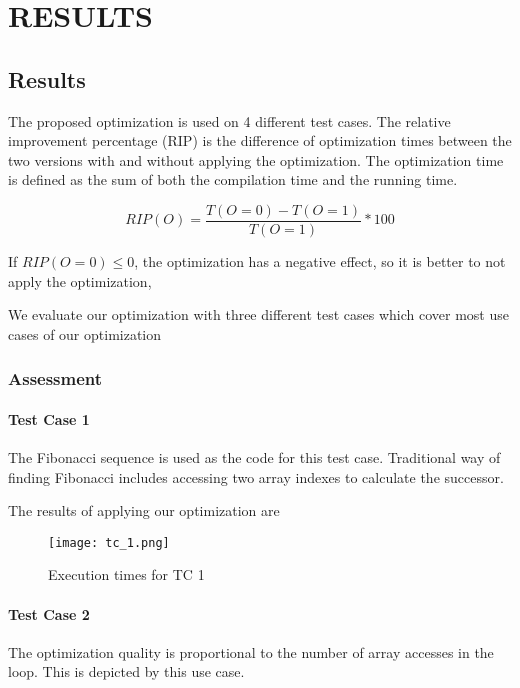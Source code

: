 
\chapter{RESULTS} %

\section{Results}
The proposed optimization is used on 4 different test cases. The relative improvement percentage (RIP) is the difference of optimization times between the two versions with and without applying the optimization. The optimization time is defined as the sum of both the compilation time and the running time.

\begin{equation*}
RIP(O) = \frac{T(O = 0) - T(O = 1)}{T(O = 1)} * 100 
\end{equation*}

If  $RIP  (O  =  0) \le 0$,  the  optimization has a negative effect, so it is better to not apply the optimization,

We evaluate our optimization with three different test cases which cover most use cases of our optimization

\subsection{Assessment}

\subsubsection{Test Case 1}

The Fibonacci sequence is used as the code for this test case. Traditional way of finding Fibonacci includes accessing two array indexes to calculate the successor. 

The results of applying our optimization are

\begin{figure}[H]
	\texttt{[image: tc\_1.png]}
	\caption{Execution times for TC 1}
	\label{TC_1}	
\end{figure}

\subsubsection{Test Case 2}

The optimization quality is proportional to the number of array accesses in the loop. This is depicted by this use case. 

